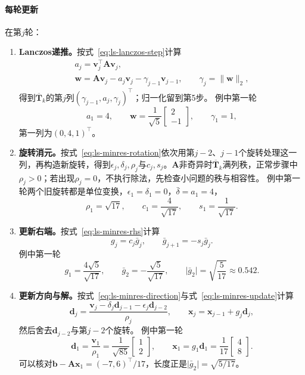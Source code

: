 \paragraph{每轮更新}
在第$j$轮：
\begin{enumerate}
 \item \textbf{Lanczos递推。}按式~\eqref{eq:ls-lanczos-step}计算
 \[
  \begin{gathered}
  a_j=\bm v_j^\top\bm A\bm v_j,\\
  \bm w=\bm A\bm v_j-a_j\bm v_j-\gamma_{j-1}\bm v_{j-1},\qquad \gamma_j=\lVert\bm w\rVert_2 ,
  \end{gathered}
 \]
 得到$\overline{\bm T}_k$的第$j$列$(\gamma_{j-1},a_j,\gamma_j)^\top$；归一化留到第5步。
 例中第一轮
 \[
  a_1=4,\qquad \bm w=\frac1{\sqrt5}\begin{bmatrix}2\\-1\end{bmatrix},\qquad \gamma_1=1 ,
 \]
 第一列为$(0,4,1)^\top$。

 \item \textbf{旋转消元。}按式~\eqref{eq:ls-minres-rotation}依次用第$j-2$、$j-1$个旋转处理这一列，再构造新旋转，得到$\epsilon_j,\delta_j,\rho_j$与$c_j,s_j$。$\bm A$非奇异时$\overline{\bm T}_k$满列秩，正常步骤中$\rho_j>0$；若出现$\rho_j=0$，不执行除法，先检查小问题的秩与相容性。
 例中第一轮两个旧旋转都是单位变换，$\epsilon_1=\delta_1=0$，$\bar\delta=a_1=4$，
 \[
  \rho_1=\sqrt{17},\qquad c_1=\frac4{\sqrt{17}},\qquad s_1=\frac1{\sqrt{17}} .
 \]

 \item \textbf{更新右端。}按式~\eqref{eq:ls-minres-rhs}计算
 \[
  g_j=c_j\bar g_j,\qquad \bar g_{j+1}=-s_j\bar g_j .
 \]
 例中第一轮
 \[
  g_1=\frac{4\sqrt5}{\sqrt{17}},\qquad \bar g_2=-\frac{\sqrt5}{\sqrt{17}},\qquad \lvert\bar g_2\rvert=\sqrt{\frac5{17}}\approx0.542 .
 \]

 \item \textbf{更新方向与解。}按式~\eqref{eq:ls-minres-direction}与式~\eqref{eq:ls-minres-update}计算
 \[
  \bm d_j=\frac{\bm v_j-\delta_j\bm d_{j-1}-\epsilon_j\bm d_{j-2}}{\rho_j},\qquad
  \bm x_j=\bm x_{j-1}+g_j\bm d_j ,
 \]
 然后舍去$\bm d_{j-2}$与第$j-2$个旋转。
 例中第一轮
 \[
  \bm d_1=\frac{\bm v_1}{\rho_1}=\frac1{\sqrt{85}}\begin{bmatrix}1\\2\end{bmatrix},\qquad
  \bm x_1=g_1\bm d_1=\frac1{17}\begin{bmatrix}4\\8\end{bmatrix}.
 \]
 可以核对$\bm b-\bm A\bm x_1=(-7,6)^\top/17$，长度正是$\lvert\bar g_2\rvert=\sqrt{5/17}$。


\end{enumerate}
